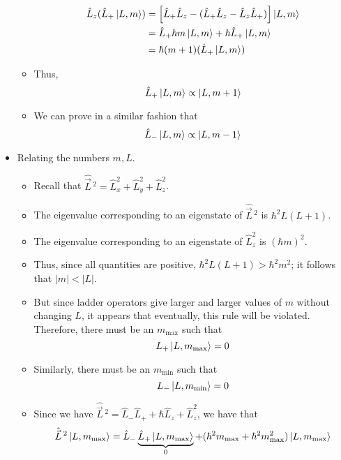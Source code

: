 \documentclass[../notes.tex]{subfiles}
\begin{document}
\begin{itemize}
\begin{itemize}
\begin{align*}
            \hat{L}_z(\hat{L}_+\ket{L,m}) &= \left[ \hat{L}_+\hat{L}_z-(\hat{L}_+\hat{L}_z-\hat{L}_z\hat{L}_+) \right]\ket{L,m}\\
            &= \hat{L}_+\hbar m\ket{L,m}+\hbar\hat{L}_+\ket{L,m}\\
            &= \hbar(m+1)(\hat{L}_+\ket{L,m})
        \end{align*}
        \item Thus,
        \begin{equation*}
            \hat{L}_+\ket{L,m} \propto \ket{L,m+1}
        \end{equation*}
        \item We can prove in a similar fashion that
        \begin{equation*}
            \hat{L}_-\ket{L,m} \propto \ket{L,m-1}
        \end{equation*}
    \end{itemize}
    \item Relating the numbers $m,L$.
    \begin{itemize}
        \item Recall that $\hat{\vec{L}}{\,}^2=\hat{L}_x^2+\hat{L}_y^2+\hat{L}_z^2$.
        \item The eigenvalue corresponding to an eigenstate of $\hat{\vec{L}}{\,}^2$ is $\hbar^2L(L+1)$.
        \item The eigenvalue corresponding to an eigenstate of $\hat{L}_z^2$ is $(\hbar m)^2$.
        \item Thus, since all quantities are positive, $\hbar^2L(L+1)>\hbar^2m^2$; it follows that $|m|<|L|$.
        \item But since ladder operators give larger and larger values of $m$ without changing $L$, it appears that eventually, this rule will be violated. Therefore, there must be an $m_\text{max}$ such that
        \begin{equation*}
            L_+\ket{L,m_\text{max}} = 0
        \end{equation*}
        \item Similarly, there must be an $m_\text{min}$ such that
        \begin{equation*}
            L_-\ket{L,m_\text{min}} = 0
        \end{equation*}
        \item Since we have $\hat{\vec{L}}{\,}^2=\hat{L}_-\hat{L}_++\hbar\hat{L}_z+\hat{L}_z^2$, we have that
        \begin{equation*}
            \hat{\vec{L}}{\,}^2\ket{L,m_\text{max}} = \hat{L}_-\underbrace{\hat{L}_+\ket{L,m_\text{max}}}_0+(\hbar^2m_\text{max}+\hbar^2m_\text{max}^2)\ket{L,m_\text{max}}

\end{equation*}
\end{itemize}
\end{itemize}
\end{document}
